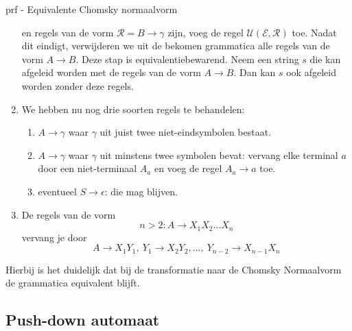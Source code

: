 \begin{prf}{prf - Equivalente Chomsky normaalvorm}
\begin{enumerate}
            en regels van de vorm $\mathcal{R} = B \to \gamma$ zijn, voeg de regel $\mathcal{U}(\mathcal{E},\mathcal{R})$ toe. Nadat dit eindigt, verwijderen we uit de bekomen grammatica alle regels van de vorm $A \to B$.
            Deze stap is equivalentiebewarend. Neem een string $s$ die kan afgeleid worden met de regels van de vorm $A \to B$. Dan kan $s$ ook afgeleid worden zonder deze regels.
        \item 
            We hebben nu nog drie soorten regels te behandelen:
            \begin{enumerate}
                \item $A \to \gamma$ waar $\gamma$ uit juist twee niet-eindsymbolen bestaat.
                \item $A \to \gamma$ waar $\gamma$ uit minstens twee symbolen bevat: vervang elke terminal $a$ door een niet-terminaal $A_a$ en voeg de regel $A_a \to a$ toe.
                \item eventueel $S \to \epsilon$: die mag blijven.
            \end{enumerate}
        \item 
            De regels van de vorm 
            \begin{equation*}
                n > 2: A \to X_1X_2 \ldots X_n
            \end{equation*} 
            vervang je door
            \begin{equation*}
                A \to X_1Y_1, \ Y_1 \to X_2Y_2, \ldots, \ Y_{n-2} \to X_{n-1}X_n
            \end{equation*}
    \end{enumerate}
    Hierbij is het duidelijk dat bij de transformatie naar de Chomsky Normaalvorm de grammatica equivalent blijft.
\end{prf}

\subsection{Push-down automaat}

\vspace{0.5cm}

